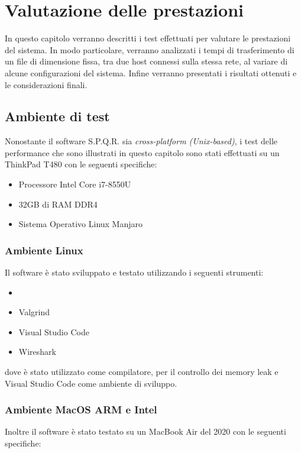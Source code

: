 \chapter{Valutazione delle prestazioni }

In questo capitolo verranno descritti i test effettuati per valutare le prestazioni del sistema.
In modo particolare, verranno analizzati i tempi di trasferimento di un file di dimensione fissa, tra due host connessi sulla stessa rete, al variare di alcune configurazioni del sistema.
Infine verranno presentati i risultati ottenuti e le considerazioni finali.

\section{Ambiente di test}
Nonostante il software S.P.Q.R. sia \textit{cross-platform (Unix-based)}, i test delle performance che sono illustrati in questo capitolo sono stati effettuati su un ThinkPad T480 con le seguenti specifiche:

\begin{itemize}
    \item Processore Intel Core i7-8550U
    \item 32GB di RAM DDR4
    \item Sistema Operativo Linux Manjaro 
\end{itemize}

\subsection{Ambiente Linux}
Il software è stato sviluppato e testato utilizzando i seguenti strumenti:

\begin{itemize}
    \item {}
    \item Valgrind 
    \item Visual Studio Code 
    \item Wireshark 
\end{itemize}

dove  è stato utilizzato come compilatore,  per il controllo dei memory leak e Visual Studio Code come ambiente di sviluppo.

\subsection{Ambiente MacOS ARM e Intel}
Inoltre il software è stato testato su un MacBook Air del 2020 con le seguenti specifiche:


